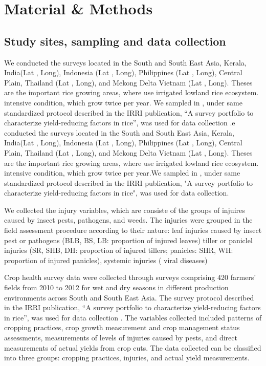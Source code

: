 \documentclass[a4paper]{article}
\begin{document}
                                                                                                                                                                                                                                                                                                 
\section*{Material \& Methods}


\subsection*{Study sites, sampling and data collection}
We conducted the surveys located in the South and South East Asia, Kerala, India(Lat , Long), Indonesia (Lat , Long), Philippines (Lat , Long), Central Plain, Thailand (Lat , Long), and Mekong Delta Vietnam (Lat , Long). Theses are the important rice growing areas, where use irrigated lowland rice ecosystem.  intensive condition, which grow twice per year. We sampled in , under same standardized protocol described in the IRRI publication, ``A survey portfolio to characterize yield-reducing factors in rice'', was used for data collection \citep{Savarysurvey2009}.e conducted the surveys located in the South and South East Asia, Kerala, India(Lat , Long), Indonesia (Lat , Long), Philippines (Lat , Long), Central Plain, Thailand (Lat , Long), and Mekong Delta Vietnam (Lat , Long). Theses are the important rice growing areas, where use irrigated lowland rice ecosystem. intensive condition, which grow twice per year.We sampled in , under same standardized protocol described in the IRRI publication, "A survey portfolio to characterize yield-reducing factors in rice", was used for data collection.


We collected the injury variables, which are consiste of the groups of injuires caused by insect pests, pathogens, and weeds. The injuries were grouped in the field assessment procedure according to their nature: leaf injuries caused by insect pest or pathogens (BLB, BS, LB: proportion of injured leaves) tiller or paniclel injuries (SR, SHB, DH: proportion of injured tillers; panicles: SHR, WH: proportion of injured panicles), systemic injuries ( viral diseases)

Crop health survey data were collected through surveys comprising 420 farmers' fields from 2010 to 2012 for wet and dry seasons in different production environments across South and South East Asia. The survey protocol described in the IRRI publication, ``A survey portfolio to characterize yield-reducing factors in rice'', was used for data collection \citep{Savarysurvey2009}. The variables collected included patterns of cropping practices, crop growth measurement and crop management status assessments, measurements of levels of injuries caused by pests, and direct measurements of actual yields from crop cuts. The data collected can be classified into three groups: cropping practices, injuries, and actual yield measurements.
\end{document}
